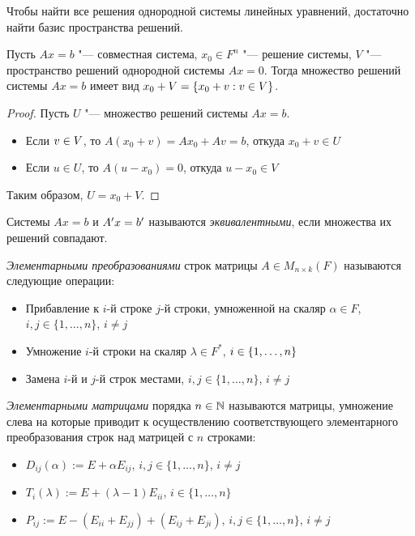 \begin{note}
	Чтобы найти все решения однородной системы линейных уравнений, достаточно найти базис пространства решений.
\end{note}

\begin{proposition}
	Пусть $Ax = b$ "--- совместная система, $x_0 \in F^n$ "--- решение системы, $V$ "--- пространство решений однородной системы $Ax = 0$. Тогда множество решений системы $Ax = b$ имеет вид $x_0 + V \hm{=} \{x_0 + v: v \in V\}$.
\end{proposition}

\begin{proof}
	Пусть $U$ "--- множество решений системы $Ax = b$.
	\begin{itemize}
		\item Если $v \hm{\in} V$, то $A(x_0 + v) = Ax_0 + Av = b$, откуда $x_0 + v \in U$
		\item Если $u \in U$, то $A(u - x_0) = 0$, откуда $u - x_0 \in V$
	\end{itemize}

	Таким образом, $U = x_0 + V$.
\end{proof}

\begin{definition}
	Системы $Ax = b$ и $A'x\hm{=}b'$ называются \textit{эквивалентными}, если множества их решений совпадают.
\end{definition}

\begin{definition}
	\textit{Элементарными преобразованиями} строк матрицы $A \in M_{n \times k}(F)$ называются следующие операции:
	\begin{itemize}
		\item Прибавление к $i$-й строке $j$-й строки, умноженной на скаляр $\alpha \in F$, $i, j \in \{1, \dotsc, n\}$, $i \ne j$
		\item Умножение $i$-й строки на скаляр $\lambda \in F^*$, $i \in \{1, \dotsc, n\}$
		\item Замена $i$-й и $j$-й строк местами, $i, j \in \{1, \dotsc, n\}$, $i \ne j$
	\end{itemize}
\end{definition}

\begin{definition}
	\textit{Элементарными матрицами} порядка $n \in \mathbb{N}$ называются матрицы, умножение слева
	на которые приводит к осуществлению соответствующего элементарного преобразования строк над матрицей с $n$ строками:
	\begin{itemize}
		\item $D_{ij}(\alpha) := E + \alpha E_{ij}$, $i, j \in \{1, \dotsc, n\}$, $i \ne j$
		\item $T_{i}(\lambda) := E + (\lambda - 1) E_{ii}$, $i \in \{1, \dotsc, n\}$
		\item $P_{ij} := E - (E_{ii} + E_{jj}) + (E_{ij} + E_{ji})$, $i, j \in \{1, \dotsc, n\}$, $i \ne j$
	\end{itemize}
\end{definition}

